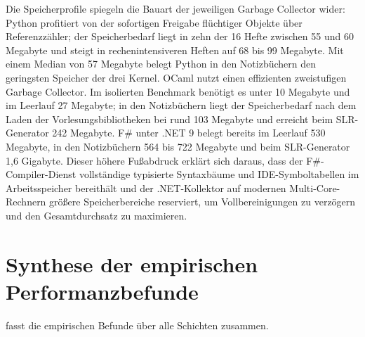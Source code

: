Die Speicherprofile spiegeln die Bauart der jeweiligen Garbage Collector wider:
Python profitiert von der sofortigen Freigabe flüchtiger Objekte über Referenzzähler; der Speicherbedarf liegt in zehn der 16 Hefte zwischen 55 und 60 Megabyte und steigt in rechenintensiveren Heften auf 68 bis 99 Megabyte.
Mit einem Median von 57 Megabyte belegt Python in den Notizbüchern den geringsten Speicher der drei Kernel.
OCaml nutzt einen effizienten zweistufigen Garbage Collector.
Im isolierten Benchmark benötigt es unter 10 Megabyte und im Leerlauf 27 Megabyte; in den Notizbüchern liegt der Speicherbedarf nach dem Laden der Vorlesungsbibliotheken bei rund 103 Megabyte und erreicht beim SLR-Generator 242 Megabyte.
F\# unter .NET 9 belegt bereits im Leerlauf 530 Megabyte, in den Notizbüchern 564 bis 722 Megabyte und beim SLR-Generator 1,6 Gigabyte.
Dieser höhere Fußabdruck erklärt sich daraus, dass der F\#-Compiler-Dienst vollständige typisierte Syntaxbäume und IDE-Symboltabellen im Arbeitsspeicher bereithält und der .NET-Kollektor auf modernen Multi-Core-Rechnern größere Speicherbereiche reserviert, um Vollbereinigungen zu verzögern und den Gesamtdurchsatz zu maximieren.

\section{Synthese der empirischen Performanzbefunde}
\label{sec:perf_synthesis}

 fasst die empirischen Befunde über alle Schichten zusammen.

